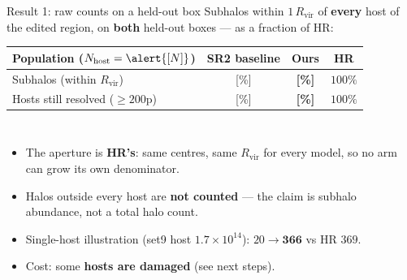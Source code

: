 \documentclass[aspectratio=169]{beamer}
\begin{document}
\begin{frame}{Result 1: raw counts on a held-out box}
\small
Subhalos within $1\,R_{\mathrm{vir}}$ of \textbf{every} host of the edited
region, on \textbf{both} held-out boxes --- as a fraction of HR:
\vspace{0.2cm}

\centering
\begin{tabular}{l c c c}
\hline
Population ($N_{\mathrm{host}}=\alert{[N]}$) & SR2 baseline & \textbf{Ours} & HR \\
\hline
Subhalos (within $R_{\mathrm{vir}}$) & \alert{[\%]} & \textbf{\alert{[\%]}} & $100\%$ \\
Hosts still resolved ($\ge200$p)     & \alert{[\%]} & \textbf{\alert{[\%]}} & $100\%$ \\
\hline
\end{tabular}

\vspace{0.35cm}
\begin{columns}[T]
\begin{itemize}
    \item The aperture is \textbf{HR's}: same centres, same $R_{\mathrm{vir}}$
          for every model, so no arm can grow its own denominator.
    \item Halos outside every host are \textbf{not counted} --- the claim is
          subhalo abundance, not a total halo count.
    \item Single-host illustration (set9 host $1.7\times10^{14}$):
          $20 \rightarrow \textbf{366}$ vs HR $369$.
    \item Cost: some \textbf{hosts are damaged} (see next steps).
\end{itemize}
\centering
\end{columns}
\end{frame}
\end{document}
